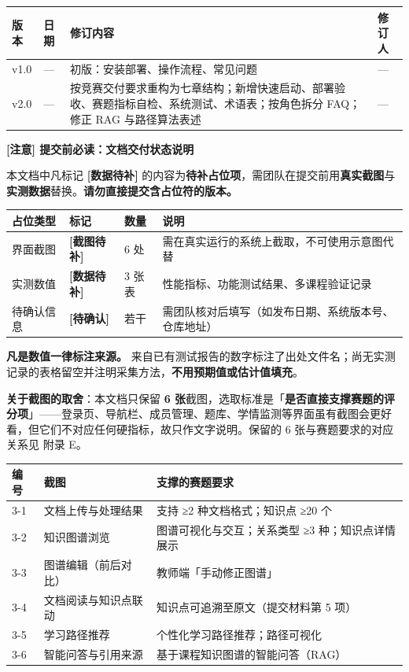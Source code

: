 \documentclass[UTF8,a4paper,11pt]{ctexrep}
\newcommand{\shotmark}{\textcolor{todobar}{\textbf{[截图待补]}}}
\newcommand{\todomark}{\textcolor{todobar}{\textbf{[数据待补]}}}
\newcommand{\verifymark}{\textcolor{todobar}{\textbf{[待确认]}}}
\newcommand{\warnmark}{\textcolor{todobar}{\textbf{[注意]}}}
\begin{document}
\begin{center}
\small
\begin{tabularx}{\linewidth}{@{}XXXX@{}}
\toprule
版本 & 日期 & 修订内容 & 修订人 \\
\midrule
v1.0 & — & 初版：安装部署、操作流程、常见问题 & — \\
v2.0 & — & 按竞赛交付要求重构为七章结构；新增快速启动、部署验收、赛题指标自检、系统测试、术语表；按角色拆分 FAQ；修正 RAG 与路径算法表述 & — \\
\bottomrule
\end{tabularx}
\end{center}
\begin{todobox}

\textbf{\warnmark{} 提交前必读：文档交付状态说明}\par

本文档中凡标记 \textbf{\todomark{}} 的内容为\textbf{待补占位项}，需团队在提交前用\textbf{真实截图}与\textbf{实测数据}替换。\textbf{请勿直接提交含占位符的版本。}

\begin{center}
\small
\begin{tabularx}{\linewidth}{@{}XXXX@{}}
\toprule
占位类型 & 标记 & 数量 & 说明 \\
\midrule
界面截图 & \shotmark{} & 6 处 & 需在真实运行的系统上截取，不可使用示意图代替 \\
实测数值 & \todomark{} & 3 张表 & 性能指标、功能测试结果、多课程验证记录 \\
待确认信息 & \verifymark{} & 若干 & 需团队核对后填写（如发布日期、系统版本号、仓库地址） \\
\bottomrule
\end{tabularx}
\end{center}
\textbf{凡是数值一律标注来源。} 来自已有测试报告的数字标注了出处文件名；尚无实测记录的表格留空并注明采集方法，\textbf{不用预期值或估计值填充}。

\textbf{关于截图的取舍}：本文档只保留 \textbf{6 张}截图，选取标准是「\textbf{是否直接支撑赛题的评分项}」——登录页、导航栏、成员管理、题库、学情监测等界面虽有截图会更好看，但它们不对应任何硬指标，故只作文字说明。保留的 6 张与赛题要求的对应关系见 附录 E。

\begin{center}
\small
\begin{tabularx}{\linewidth}{@{}XXX@{}}
\toprule
编号 & 截图 & 支撑的赛题要求 \\
\midrule
3-1 & 文档上传与处理结果 & 支持 ≥2 种文档格式；知识点 ≥20 个 \\
3-2 & 知识图谱浏览 & 图谱可视化与交互；关系类型 ≥3 种；知识点详情展示 \\
3-3 & 图谱编辑（前后对比） & 教师端「手动修正图谱」 \\
3-4 & 文档阅读与知识点联动 & 知识点可追溯至原文（提交材料第 5 项） \\
3-5 & 学习路径推荐 & 个性化学习路径推荐；路径可视化 \\
3-6 & 智能问答与引用来源 & 基于课程知识图谱的智能问答（RAG） \\
\bottomrule
\end{tabularx}
\end{center}
\end{todobox}
\end{document}
